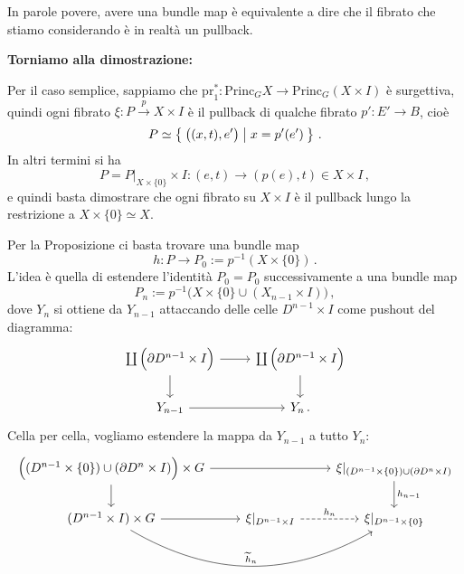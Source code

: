 In parole povere, avere una bundle map è equivalente
a dire che il fibrato che stiamo considerando è in realtà un pullback.

\textbf{Torniamo alla dimostrazione:}

Per il caso semplice, sappiamo che 
$\mathrm{pr}_{1}^{*}:\mathrm{Princ}_{G}X \to \mathrm{Princ}_{G}(X  \times I)$
è surgettiva, quindi ogni fibrato $\xi : P \xrightarrow{p} X \times I$
è il pullback di qualche fibrato $p':E' \to B$, cioè
\begin{equation*}
	P \simeq \Set{ \big( (x,t),e' \big) | x = p'(e') }\,.
\end{equation*}
In altri termini si ha
 $$P = P\vert_{X \times \{0\}} \times I : (e,t) \to (p(e),t) \in X \times I \,,$$
e quindi basta dimostrare che ogni fibrato su $X \times I$
è il pullback lungo la restrizione a $X \times \{0\} \simeq X$.

Per la Proposizione ci basta trovare una bundle map
\begin{equation*}
	h : P \to P_{0}:=p^{-1}(X \times \{0\})\,.
\end{equation*}
L'idea è quella di estendere l'identità $P_{0} = P_{0}$
successivamente a una bundle map
\begin{equation*}
	P_{n} := p^{-1}\Big(X \times \{0\} \cup (X_{n-1} \times I) \Big)\,,
\end{equation*}
dove $Y_{n}$ si ottiene da $Y_{n-1}$ attaccando delle celle $D^{n-1} \times I$
come pushout del diagramma:
\begin{equation*}
	\begin{tikzcd}
		\coprod \Big( \de D^{n-1} \times I \Big) \ar[r] \ar[d]
		& \coprod \Big( \de D^{n-1} \times I \Big) \ar[d] \\
		Y_{n-1} \ar[r] & Y_{n}\,.
	\end{tikzcd}
\end{equation*}
Cella per cella, vogliamo estendere la mappa da $Y_{n-1}$ a tutto $Y_{n}$:
\begin{equation*}
	\begin{tikzcd}
		\Big( (D^{n-1} \times \{0\}) \cup (\de D^{n} \times I) \Big) \times G \ar[rr] \ar[d]
		& & \xi\vert_{(D^{n-1} \times \{0\}) \cup (\de D^{n} \times I) } \ar[d, "h_{n-1}"] \\
		(D^{n-1} \times I) \times G \ar[r] \ar[rr, bend right, "\widetilde{h}_{n}"]
		& \xi\vert_{D^{n-1} \times I} \ar[r, "h_{n}", dashed]
		& \xi\vert_{D^{n-1} \times \{0\}}
	\end{tikzcd}
\end{equation*}

